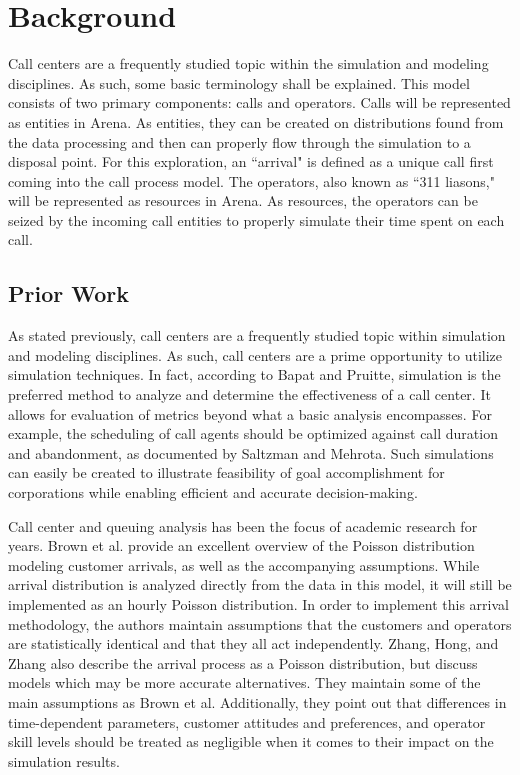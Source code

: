 \documentclass[12pt,twocolumn]{article}
\begin{document}
\section{Background}
Call centers are a frequently studied topic within the simulation and modeling disciplines.  As such, some basic terminology shall be explained.  This model consists of two primary components:  calls and operators.  Calls will be represented as entities in Arena.  As entities, they can be created on distributions found from the data processing and then can properly flow through the simulation to a disposal point.  For this exploration, an ``arrival" is defined as a unique call first coming into the call process model.  The operators, also known as ``311 liasons," will be represented as resources in Arena.  As resources, the operators can be seized by the incoming call entities to properly simulate their time spent on each call.

	\subsection{Prior Work}

As stated previously, call centers are a frequently studied topic within simulation and modeling disciplines.  As such, call centers are a prime opportunity to utilize simulation techniques.  In fact, according to Bapat and Pruitte, simulation is the preferred method to analyze and determine the effectiveness of a call center.\cite{bapat}  It allows for evaluation of metrics beyond what a basic analysis encompasses.  For example, the scheduling of call agents should be optimized against call duration and abandonment, as documented by Saltzman and Mehrota\cite{saltzman}.  Such simulations can easily be created to illustrate feasibility of goal accomplishment for corporations while enabling efficient and accurate decision-making\cite{saltzman}.

\par


Call center and queuing analysis has been the focus of academic research for years.  Brown et al. provide an excellent overview of the Poisson distribution modeling customer arrivals, as well as the accompanying assumptions\cite{brown}.  While arrival distribution is analyzed directly from the data in this model, it will still be implemented as an hourly Poisson distribution. In order to implement this arrival methodology, the authors maintain assumptions that the customers and operators are statistically identical and that they all act independently.  Zhang, Hong, and Zhang also describe the arrival process as a Poisson distribution, but discuss models which may be more accurate alternatives\cite{zhang}.  They maintain some of the main assumptions as Brown et al.  Additionally, they point out that differences in time-dependent parameters, customer attitudes and preferences, and operator skill levels should be treated as negligible when it comes to their impact on the simulation results.
\end{document}
